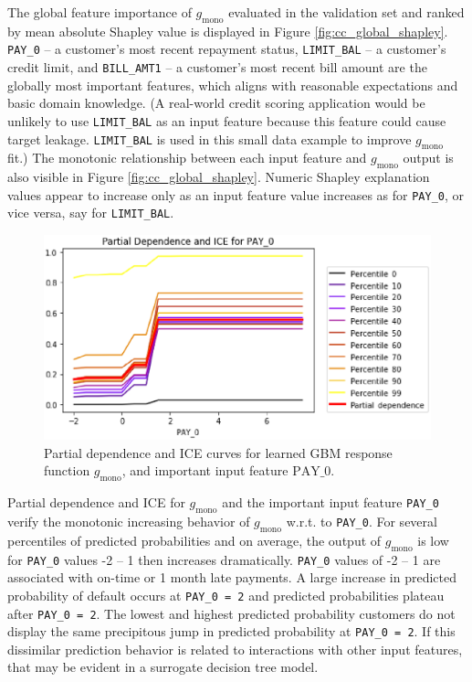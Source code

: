 \documentclass[11pt]{asaproc}
\begin{document}
The global feature importance of $g_{\text{mono}}$ evaluated in the validation set and ranked by mean absolute Shapley value is displayed in Figure \ref{fig:cc_global_shapley}. \texttt{PAY\_0} -- a customer's most recent repayment status, \texttt{LIMIT\_BAL} -- a customer's credit limit, and \texttt{BILL\_AMT1} -- a customer's most recent bill amount are the globally most important features, which aligns with reasonable expectations and basic domain knowledge. (A real-world credit scoring application would be unlikely to use \texttt{LIMIT\_BAL} as an input feature because this feature could cause target leakage. \texttt{LIMIT\_BAL} is used in this small data example to improve $g_{\text{mono}}$ fit.) The monotonic relationship between each input feature and $g_{\text{mono}}$ output is also visible in Figure \ref{fig:cc_global_shapley}. Numeric Shapley explanation values appear to increase only as an input feature value increases as for \texttt{PAY\_0}, or vice versa, say for \texttt{LIMIT\_BAL}. 

\begin{figure}[htb]
	\begin{center}
		\includegraphics[scale=0.6]{img/figure_8.eps}
		\caption{Partial dependence and ICE curves for learned GBM response function $g_{\text{mono}}$, and important input feature $\text{PAY\_0}$.}
		\label{fig:cc_pdp_ice}
	\end{center}
\end{figure}

Partial dependence and ICE for $g_{\text{mono}}$ and the important input feature \texttt{PAY\_0} verify the monotonic increasing behavior of $g_{\text{mono}}$ w.r.t. to \texttt{PAY\_0}. For several percentiles of predicted probabilities and on average, the output of $g_{\text{mono}}$ is low for \texttt{PAY\_0} values -2 -- 1 then increases dramatically. \texttt{PAY\_0} values of -2 -- 1 are associated with on-time or 1 month late payments. A large increase in predicted probability of default occurs at \texttt{PAY\_0 = 2} and predicted probabilities plateau after \texttt{PAY\_0 = 2}. The lowest and highest predicted probability customers do not display the same precipitous jump in predicted probability at \texttt{PAY\_0 = 2}. If this dissimilar prediction behavior is related to interactions with other input features, that may be evident in a surrogate decision tree model.
\end{document}
